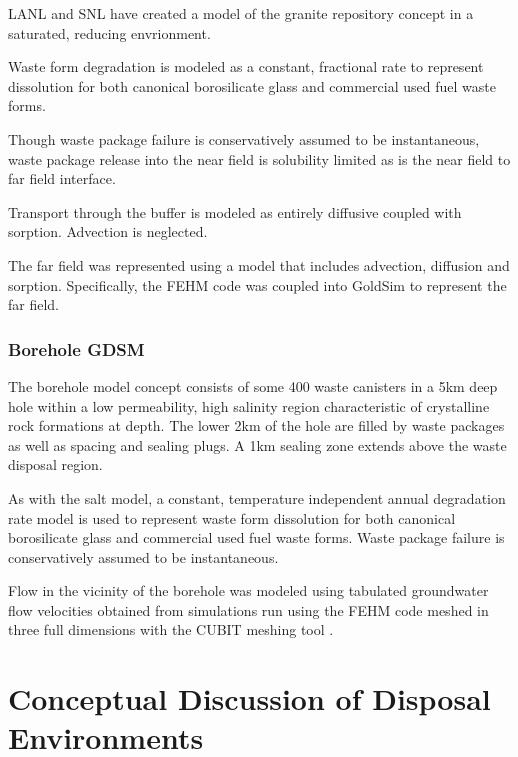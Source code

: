{\gls{LANL} and \gls{SNL} have created a model of the granite repository concept  
in a saturated, reducing envrionment.

Waste form degradation is modeled as a constant, fractional rate to represent 
dissolution for both canonical borosilicate glass and commercial used fuel 
waste forms.  

Though waste package failure is conservatively assumed to be instantaneous,
waste package release into the near field is solubility limited as is the near 
field to far field interface. 

Transport through the buffer is modeled as entirely diffusive coupled with 
sorption. Advection is neglected.

The far field was represented using a model that includes advection, diffusion 
and sorption. Specifically, the \gls{FEHM} code was coupled into GoldSim to 
represent the far field.

\subsubsection{ Borehole GDSM}

The borehole model concept consists of some 400 waste canisters in a 5km deep 
hole within a low permeability, high salinity region characteristic of 
crystalline rock formations at depth. The lower 2km of the hole are filled 
by waste packages as well as spacing and sealing plugs. A 1km sealing zone 
extends above the waste disposal region.

As with the salt model, a constant, temperature independent annual degradation
rate model is used to represent waste form dissolution for both canonical 
borosilicate glass and commercial used fuel waste forms. Waste package failure 
is conservatively assumed to be instantaneous.

Flow in the vicinity of the borehole was modeled using tabulated groundwater 
flow velocities obtained from simulations run using the \gls{FEHM} code 
meshed in three full dimensions with the \gls{CUBIT} meshing tool 
\cite{clayton_generic_2011}.

\section{Conceptual Discussion of Disposal Environments}


}
